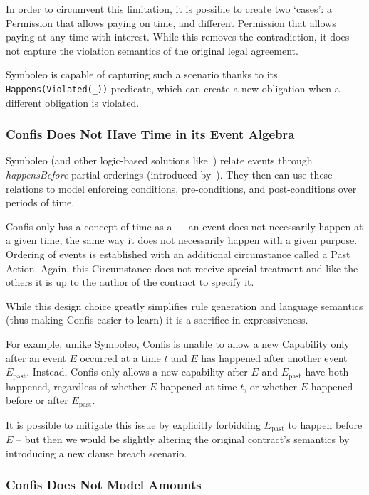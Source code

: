 In order to circumvent this limitation, it is possible to create two `cases': a Permission that allows paying on time, and different Permission that allows paying at any time with interest.
While this removes the contradiction, it does not capture the violation semantics of the original legal agreement.

Symboleo is capable of capturing such a scenario thanks to its \texttt{Happens(Violated(\_))} predicate, which can create a new obligation when a different obligation is violated.

\subsubsection{Confis Does Not Have Time in its Event Algebra}
\label{subsubsec:limits-time}

Symboleo (and other logic-based solutions like~\cite{knottenbeltContractDriven}) relate events through \emph{happensBefore} partial orderings (introduced by~\cite{kowalski1989logicEventBased}).
They then can use these relations to model enforcing conditions, pre-conditions, and post-conditions over periods of time.

Confis only has a concept of time as a~ -- an event does not necessarily happen at a given time, the same way it does not necessarily happen with a given purpose.
Ordering of events is established with an additional circumstance called a Past Action.
Again, this Circumstance does not receive special treatment and like the others it is up to the author of the contract to specify it.

While this design choice greatly simplifies rule generation and language semantics (thus making Confis easier to learn) it is a sacrifice in expressiveness.

For example, unlike Symboleo, Confis is unable to allow a new Capability only after an event $E$ occurred at a time $t$ and $E$ has happened after another event $E_{\text{past}}$.
Instead, Confis only allows a new capability after $E$ and $E_{\text{past}}$ have both happened, regardless of whether $E$ happened at time $t$, or whether $E$ happened before or after $E_{\text{past}}$.

It is possible to mitigate this issue by explicitly forbidding $E_{\text{past}}$ to happen before $E$ -- but then we would be slightly altering the original contract's semantics by introducing a new clause breach scenario.

\subsubsection{Confis Does Not Model Amounts}
\label{subsubsec:limits-amounts}

